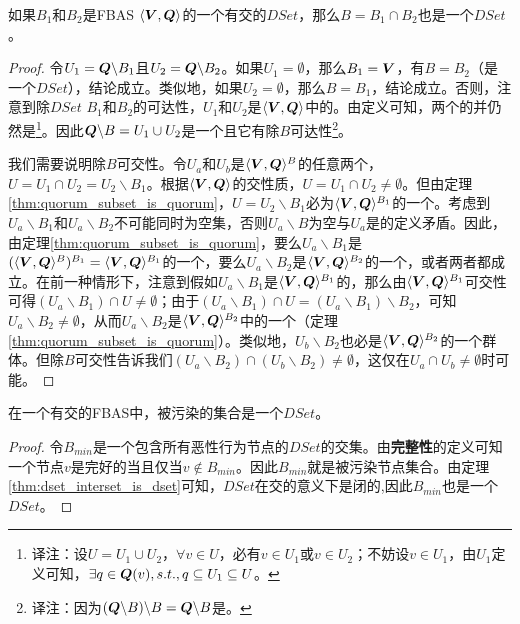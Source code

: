 \begin{theorem}\label{thm:dset_interset_is_dset}
        如果$B_1$和$B_2$是FBAS $\langle{\bm V},{\bm Q}\rangle$的一个有{\quorum}交的$DSet$，那么$B=B_1\cap B_2$也是一个$DSet$。
\end{theorem}

\begin{proof}
        令$U_1={\bm Q}\backslash B_1$且$U_2={\bm Q}\backslash B_2$。如果$U_1=\emptyset$，那么$B_1={\bm V}$，有$B=B_2$（是一个$DSet$），结论成立。类似地，如果$U_2=\emptyset$，那么$B=B_1$，结论成立。否则，注意到除$DSet$ $B_1$和$B_2$的{\quorum}可达性，$U_1$和$U_2$是$\langle{\bm V},{\bm Q}\rangle$中的{\quorum}。由定义可知，两个{\quorum}的并仍然是{\quorum}{\footnote{译注：设$U=U_1\cup U_2$，$\forall v\in U$，必有$v\in U_1$或$v\in U_2$；不妨设$v\in U_1$，由$U_1$定义可知，$\exists q\in {\bm Q}(v), s.t., q\subseteq U_1\subseteq U$。}}。因此${{\bm Q}\backslash B}=U_1\cup U_2$是一个{\quorum}且它有除$B${\quorum}可达性{\footnote{译注：因为$({\bm Q}\backslash B)\backslash B={\bm Q}\backslash B$是{\quorum}。}}。
        
        我们需要说明除$B${\quorum}可交性。令$U_a$和$U_b$是$\langle{\bm V},{\bm Q}\rangle^{B}$的任意两个{\quorum}，$U=U_1\cap U_2 = U_2\backslash B_1$。根据$\langle{\bm V},{\bm Q}\rangle$的{\quorum}交性质，$U=U_1\cap U_2  \neq \emptyset$。但由定理\ref{thm:quorum_subset_is_quorum}，$U=U_2\backslash B_1$必为$\langle{\bm V},{\bm Q}\rangle^{B_1}$的一个{\quorum}。考虑到$U_a\backslash B_1$和$U_a\backslash B_2$不可能同时为空集，否则$U_a\backslash B$为空与$U_a$是{\quorum}的定义矛盾。因此，由定理\ref{thm:quorum_subset_is_quorum}，要么$U_a\backslash B_1$是$(\langle{\bm V},{\bm Q}\rangle^{B})^{B_1}=\langle{\bm V},{\bm Q}\rangle^{B_1}$的一个{\quorum}，要么$U_a\backslash B_2$是$\langle{\bm V},{\bm Q}\rangle^{B_2}$的一个{\quorum}，或者两者都成立。在前一种情形下，注意到假如$U_a\backslash B_1$是$\langle{\bm V},{\bm Q}\rangle^{B_1}$的{\quorum}，那么由$\langle{\bm V},{\bm Q}\rangle^{B_1}${\quorum}可交性可得$(U_a\backslash B_1)\cap U\neq \emptyset$；由于$(U_a\backslash B_1)\cap U = (U_a\backslash B_1)\backslash B_2$，可知$U_a\backslash B_2\neq \emptyset$，从而$U_a\backslash B_2$是$\langle{\bm V},{\bm Q}\rangle^{B_2}$中的一个{\quorum}（定理\ref{thm:quorum_subset_is_quorum}）。类似地，$U_b\backslash B_2$也必是$\langle{\bm V},{\bm Q}\rangle^{B_2}$的一个群体。但除$B${\quorum}可交性告诉我们$(U_a\backslash B_2)\cap (U_b\backslash B_2)\neq \emptyset$，这仅在$U_a\cap U_b\neq \emptyset$时可能。
\end{proof}

\begin{theorem}\label{th3}
        在一个有{\quorum}交的FBAS中，被污染的集合是一个$DSet$。
\end{theorem}

\begin{proof}
        令$B_{min}$是一个包含所有恶性行为节点的$DSet$的交集。由\textbf{完整性}的定义可知一个节点$v$是完好的当且仅当$v\not\in B_{min}$。因此$B_{min}$就是被污染节点集合。由定理\ref{thm:dset_interset_is_dset}可知，$DSet$在交的意义下是闭的,因此$B_{min}$也是一个$DSet$。
\end{proof}
